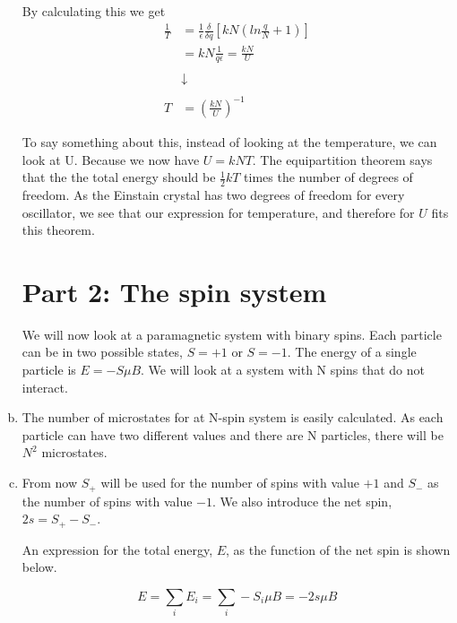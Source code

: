 \documentclass[a4paper,norsk,12pt,oneside]{article}
\begin{document}
\begin{enumerate}[a)]
        By calculating this we get
        \begin{align*}
            \frac{1}{T} &= \frac{1}{\epsilon} \frac{\delta}{\delta q}[kN(ln \frac{q}{N} + 
            1)]\\
            & = kN\frac{1}{q\epsilon} = \frac{kN}{U}\\ \\
            &\downarrow \\ \\
            T &= \left ( \frac{kN}{U} \right )^{-1}
        \end{align*}

        To say something about this, instead of looking at the temperature, we can look
        at U. Because we now have \(U = kNT\). The equipartition theorem says that the 
        the total energy should be \(\frac{1}{2}kT\) times the number of degrees of freedom. 
        As the Einstain crystal has two degrees of freedom for every oscillator, we see
        that our expression for temperature, and therefore for \(U\) fits this theorem. 

\section{Part 2: The spin system}


        We will now look at a paramagnetic system with binary spins. Each particle can
        be in two possible states, \(S = +1\) or \(S = -1\). The energy of a single particle
        is \(E = -S\mu B\). We will look at a system with N spins that do not interact. 

    \item

        The number of microstates for at N-spin system is easily calculated. As each 
        particle can have two different values and there are N particles, there will be 
        \(N^2\) microstates. 

    \item

        From now \(S_+\) will be used for the number of spins with value \(+1\) and \(S_-\) 
        as the number of spins with value \(-1\). We also introduce the net spin, \(2s = 
        S_+ - S_-\).

        An expression for the total energy, \(E\), as the function of the net spin
        is shown below. 

        \begin{equation*}
            E = \sum\limits_i E_i = \sum\limits_i -S_i \mu B = -2s \mu B
        \end{equation*}


\end{enumerate}
\end{document}
